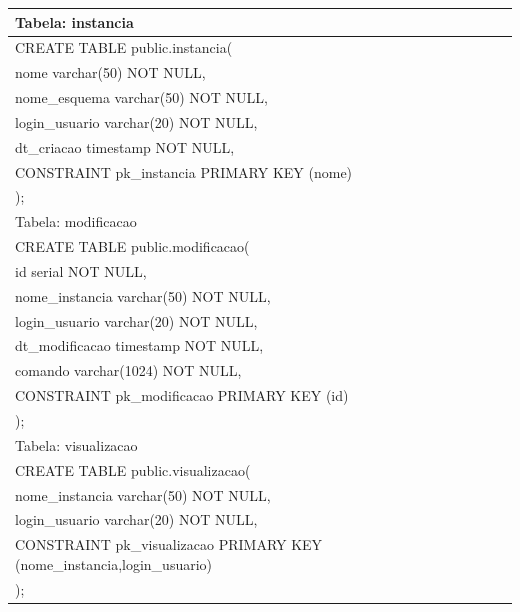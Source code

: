 \documentclass[graduacao,brazil]{ThesisPUC}
\begin{document}
\begin{table}[H]
{\begin{tabular}{|l|}
    Tabela: instancia                                                                                                                                                                                                                                                          \\ \hline
    CREATE TABLE public.instancia( \\	nome varchar(50) NOT NULL, \\	nome\_esquema varchar(50) NOT NULL, \\	login\_usuario varchar(20) NOT NULL, \\	dt\_criacao timestamp NOT NULL, \\	CONSTRAINT pk\_instancia PRIMARY KEY (nome) \\);                                         \\ \hline
    Tabela: modificacao                                                                                                                                                                                                                                                        \\ \hline
    CREATE TABLE public.modificacao( \\	id serial NOT NULL, \\	nome\_instancia varchar(50) NOT NULL, \\	login\_usuario varchar(20) NOT NULL, \\	dt\_modificacao timestamp NOT NULL, \\	comando varchar(1024) NOT NULL, \\	CONSTRAINT pk\_modificacao PRIMARY KEY (id) \\);     \\ \hline
    Tabela: visualizacao                                                                                                                                                                                                                                                       \\ \hline
    CREATE TABLE public.visualizacao( \\	nome\_instancia varchar(50) NOT NULL, \\	login\_usuario varchar(20) NOT NULL, \\	CONSTRAINT pk\_visualizacao PRIMARY KEY (nome\_instancia,login\_usuario) \\);                                                                        \\ \hline

\end{tabular}}
\end{table}
\end{document}
